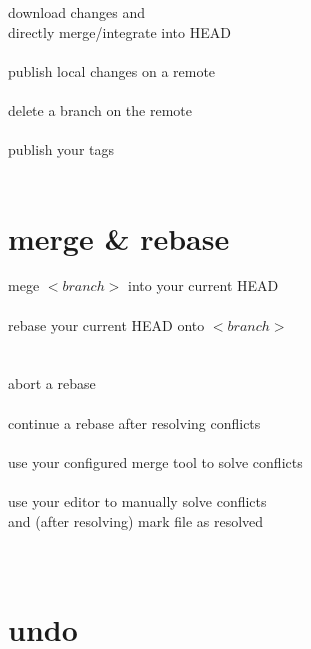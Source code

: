 \documentclass[12pt,landscape]{article}
\begin{document}
\begin{multicols*}{3}
download changes and \\
\textcolor{solarized_green}{directly merge/integrate into HEAD} \\
 \\

publish local changes on a remote \\
 \\

delete a branch on the remote \\
 \\

publish your tags \\
 \\

\section{merge \& rebase}

mege \(<branch>\) into your current HEAD \\
 \\

rebase your current HEAD onto \(<branch>\) \\
 \\
 \\

abort a rebase \\
 \\

continue a rebase after resolving conflicts \\
 \\

use your configured merge tool to solve conflicts \\
 \\

use your editor to manually solve conflicts \\
and (after resolving) mark file as resolved \\
 \\
 \\

\section{undo}


\end{multicols*}
\end{document}
